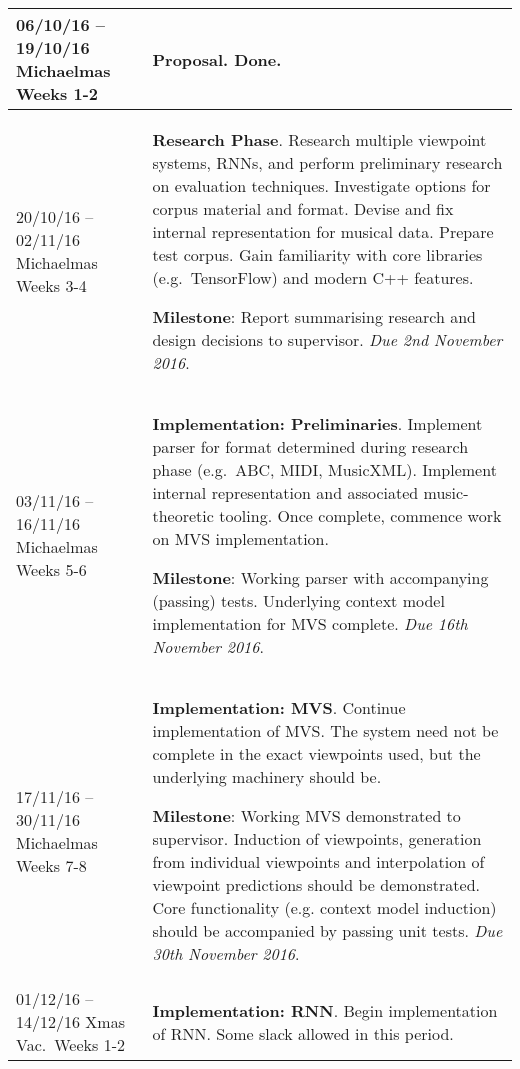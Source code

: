 \documentclass[12pt,a4paper,twoside]{article}
\begin{document}
\begin{longtable}{ p{4cm} | p{11cm} } \hline 
06/10/16 -- 19/10/16 Michaelmas Weeks 1-2 & \textbf{Proposal}. Done. \\ \hline
20/10/16 -- 02/11/16 Michaelmas Weeks 3-4 & \textbf{Research Phase}. 
Research multiple viewpoint systems, RNNs, and perform preliminary research on
evaluation techniques.  Investigate options for corpus material and format.
Devise and fix internal representation for musical data. Prepare test corpus.
Gain familiarity with core libraries (e.g.\ TensorFlow) and modern C++ features.
\newline\vspace{0mm}

\textbf{Milestone}: Report summarising research and design decisions to
supervisor. \emph{Due 2nd November 2016}.
\\ \hline
03/11/16 -- 16/11/16 Michaelmas Weeks 5-6 & \textbf{Implementation:
	Preliminaries}.
Implement parser for format determined during research phase (e.g.\ ABC, MIDI,
MusicXML). Implement internal representation and associated music-theoretic
tooling. Once complete, commence work on MVS implementation. 
\newline\vspace{0mm}

\textbf{Milestone}: Working parser with accompanying (passing) tests. Underlying
context model implementation for MVS complete. \emph{Due 16th
  November 2016}.
\\ \hline

17/11/16 -- 30/11/16 Michaelmas Weeks 7-8 & \textbf{Implementation: MVS}.
Continue implementation of MVS. The system need not be complete in the exact
viewpoints used, but the underlying machinery should be. 
\newline\vspace{0mm}

\textbf{Milestone}: Working MVS demonstrated to supervisor. Induction of
viewpoints, generation from individual viewpoints and interpolation of viewpoint
predictions should be demonstrated. Core functionality (e.g. context model
induction) should be accompanied by passing unit tests. 
\emph{Due 30th November 2016}. \\ \hline

01/12/16 -- 14/12/16 Xmas Vac.\ Weeks 1-2 & \textbf{Implementation: RNN}.
Begin implementation of RNN. Some slack allowed in this period. 
\newline\vspace{0mm}


\end{longtable}
\end{document}
